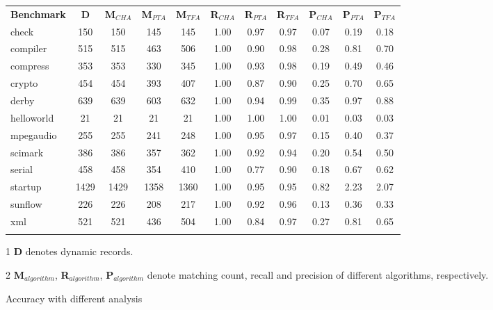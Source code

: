 \documentclass{fac}
\begin{document}
\begin{figure}\centering
\begin{threeparttable}[b]
\begin{tabular}{lcccccccccc}
	\fullhline
	\textbf{Benchmark} & \textbf{D} & \textbf{M$_{CHA}$} & \textbf{M$_{PTA}$} & \textbf{M$_{TFA}$} & \textbf{R$_{CHA}$} & \textbf{R$_{PTA}$} & \textbf{R$_{TFA}$} & \textbf{P$_{CHA}$} & \textbf{P$_{PTA}$} & \textbf{P$_{TFA}$} \hspace{2pt}\\
	\fullhline
check & 150 & 150 & 145 & 145 & 1.00 & 0.97 & 0.97 & 0.07 & 0.19 & 0.18\\
compiler & 515 & 515 & 463 & 506 & 1.00 & 0.90 & 0.98 & 0.28 & 0.81 & 0.70\\
compress & 353 & 353 & 330 & 345 & 1.00 & 0.93 & 0.98 & 0.19 & 0.49 & 0.46\\
crypto & 454 & 454 & 393 & 407 & 1.00 & 0.87 & 0.90 & 0.25 & 0.70 & 0.65\\
derby & 639 & 639 & 603 & 632 & 1.00 & 0.94 & 0.99 & 0.35 & 0.97 & 0.88\\
helloworld & 21 & 21 & 21 & 21 & 1.00 & 1.00 & 1.00 & 0.01 & 0.03 & 0.03\\
mpegaudio & 255 & 255 & 241 & 248 & 1.00 & 0.95 & 0.97 & 0.15 & 0.40 & 0.37\\
scimark & 386 & 386 & 357 & 362 & 1.00 & 0.92 & 0.94 & 0.20 & 0.54 & 0.50\\
serial & 458 & 458 & 354 & 410 & 1.00 & 0.77 & 0.90 & 0.18 & 0.67 & 0.62\\
startup & 1429 & 1429 & 1358 & 1360 & 1.00 & 0.95 & 0.95 & 0.82 & 2.23 & 2.07\\
sunflow & 226 & 226 & 208 & 217 & 1.00 & 0.92 & 0.96 & 0.13 & 0.36 & 0.33\\
xml & 521 & 521 & 436 & 504 & 1.00 & 0.84 & 0.97 & 0.27 & 0.81 & 0.65\\
	\fullhline
\end{tabular}
\caption{Accuracy with different analysis}
\label{fig:accuracy}
\begin{tablenotes}
  \item[1] \textbf{D} denotes dynamic records.
  \item[2] \textbf{M$_{algorithm}$}, \textbf{R$_{algorithm}$}, \textbf{P$_{algorithm}$} denote matching count, recall and precision of different algorithms, respectively.
\end{tablenotes}
\end{threeparttable}
\end{figure}
\end{document}

